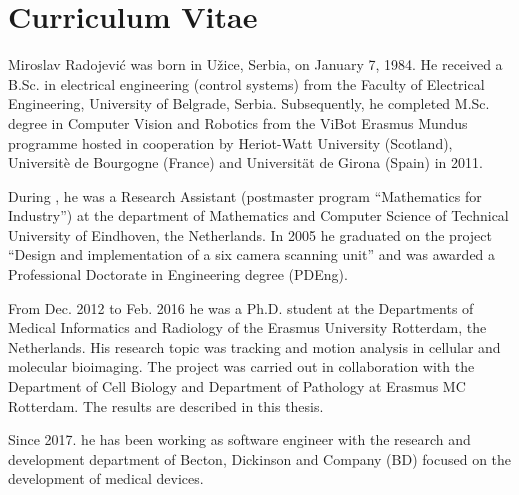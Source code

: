 %
%

\noquote
\orgchpos
\chapter*{Curriculum Vitae}

\noindent
Miroslav Radojevi\'{c} was born in U\v{z}ice, Serbia, on January 7, 1984. He received a B.Sc. in electrical engineering (control systems) from the Faculty of Electrical Engineering, University of Belgrade, Serbia. Subsequently, he completed M.Sc. degree in Computer Vision and Robotics from the ViBot Erasmus Mundus programme hosted in cooperation by Heriot-Watt University (Scotland), Universit\`{e} de Bourgogne (France) and Universit\"{a}t de Girona (Spain) in 2011. 

\bigskip
\noindent
During , he was a Research Assistant (postmaster program ``Mathematics for Industry'') at the department of Mathematics and Computer Science of Technical University of Eindhoven, the Netherlands. In 2005 he graduated on the project ``Design and implementation of a six camera scanning unit'' and was awarded a Professional Doctorate in Engineering degree (PDEng). 

\bigskip
\noindent
From Dec. 2012 to Feb. 2016 he was a Ph.D. student at the Departments of Medical Informatics and Radiology of the Erasmus University Rotterdam, the Netherlands. His research topic was tracking and motion analysis in cellular and molecular bioimaging. The project was carried out in collaboration with the Department of Cell Biology and Department of Pathology at Erasmus MC Rotterdam. The results are described in this thesis.

\bigskip
\noindent
Since 2017. he has been working as software engineer with the research and development department of Becton, Dickinson and Company (BD) focused on the development of medical devices.